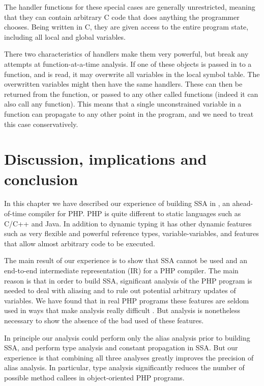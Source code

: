 The handler functions for these special cases are generally
unrestricted, meaning that they can contain arbitrary C code that does
anything the programmer chooses.  Being written in C, they are given
access to the entire program state, including all local and global
variables.

There two characteristics of handlers make them very powerful, but
break any attempts at function-at-a-time analysis.  If one of these
objects is passed in to a function, and is read, it may overwrite all
variables in the local symbol table.  The overwritten variables might
then have the same handlers.  These can then be returned from the
function, or passed to any other called functions (indeed it can also
call any function).  This means that a single unconstrained variable
in a function can propagate to any other point in the program, and we
need to treat this case conservatively.


\section{Discussion, implications and conclusion}
In this chapter we have described our experience of building SSA in
\phc, an ahead-of-time compiler for PHP. PHP is quite different to
static languages such as C/C++ and Java. In addition to
dynamic typing it has other dynamic features such as very flexible and
powerful reference types, variable-variables, and features that allow
almost arbitrary code to be executed.

The main result of our experience is to show that SSA cannot be used
and an end-to-end intermediate representation (IR) for a PHP
compiler. The main reason is that in order to build SSA, significant
analysis of the PHP program is needed to deal with aliasing and to
rule out potential arbitrary updates of variables. We have found that
in real PHP programs these features are seldom used in ways that make
analysis really difficult \cite{Biggar2010}. But analysis is
nonetheless necessary to show the absence of the bad used of these
features.

In principle our analysis could perform only the alias analysis prior
to building SSA, and perform type analysis and constant propagation in
SSA. But our experience is that combining all three analyses greatly
improves the precision of alias analysis.  In particular, type
analysis significantly reduces the number of possible method callees
in object-oriented PHP programs.


